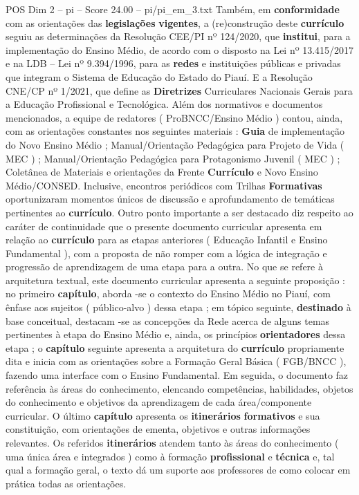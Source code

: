 \begin{textsample}{POS Dim 2 – pi – Score 24.00 – pi/pi\_em\_3.txt}
Também, em \textbf{conformidade} com as orientações das \textbf{legislações} \textbf{vigentes}, a (re)construção deste \textbf{currículo} seguiu as determinações da Resolução CEE/PI nº 124/2020, que \textbf{institui}, para a implementação do Ensino Médio, de acordo com o disposto na Lei nº 13.415/2017 e na LDB – Lei nº 9.394/1996, para as \textbf{redes} e instituições públicas e privadas que integram o Sistema de Educação do Estado do Piauí.
E a Resolução CNE/CP nº 1/2021, que define as \textbf{Diretrizes} Curriculares Nacionais Gerais para a Educação Profissional e Tecnológica.
Além dos normativos e documentos mencionados, a equipe de redatores ( ProBNCC/Ensino Médio ) contou, ainda, com as orientações constantes nos seguintes materiais : \textbf{Guia} de implementação do Novo Ensino Médio ; Manual/Orientação Pedagógica para Projeto de Vida ( MEC ) ; Manual/Orientação Pedagógica para Protagonismo Juvenil ( MEC ) ; Coletânea de Materiais e orientações da Frente \textbf{Currículo} e Novo Ensino Médio/CONSED.
Inclusive, encontros periódicos com Trilhas \textbf{Formativas} oportunizaram momentos únicos de discussão e aprofundamento de temáticas pertinentes ao \textbf{currículo}.
Outro ponto importante a ser destacado diz respeito ao caráter de continuidade que o presente documento curricular apresenta em relação ao \textbf{currículo} para as etapas anteriores ( Educação Infantil e Ensino Fundamental ), com a proposta de não romper com a lógica de integração e progressão de aprendizagem de uma etapa para a outra.
No que se refere à arquitetura textual, este documento curricular apresenta a seguinte proposição : no primeiro \textbf{capítulo}, aborda -se o contexto do Ensino Médio no Piauí, com ênfase aos sujeitos ( público-alvo ) dessa etapa ; em tópico seguinte, \textbf{destinado} à base conceitual, destacam -se as concepções da Rede acerca de alguns temas pertinentes à etapa do Ensino Médio e, ainda, os princípios \textbf{orientadores} dessa etapa ; o \textbf{capítulo} seguinte apresenta a arquitetura do \textbf{currículo} propriamente dita e inicia com as orientações sobre a Formação Geral Básica ( FGB/BNCC ), fazendo uma interface com o Ensino Fundamental.
Em seguida, o documento faz referência às áreas do conhecimento, elencando competências, habilidades, objetos do conhecimento e objetivos da aprendizagem de cada área/componente curricular.
O último \textbf{capítulo} apresenta os \textbf{itinerários} \textbf{formativos} e sua constituição, com orientações de ementa, objetivos e outras informações relevantes.
Os referidos \textbf{itinerários} atendem tanto às áreas do conhecimento ( uma única área e integrados ) como à formação \textbf{profissional} e \textbf{técnica} e, tal qual a formação geral, o texto dá um suporte aos professores de como colocar em prática todas as orientações.

\end{textsample}
